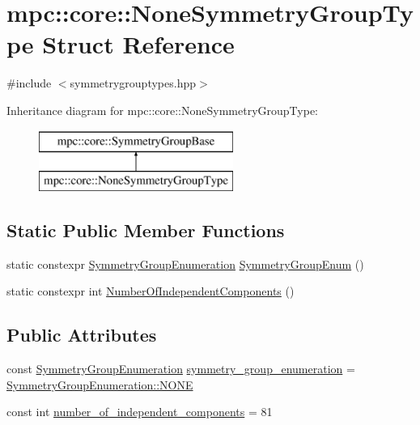 \hypertarget{structmpc_1_1core_1_1_none_symmetry_group_type}{}\section{mpc\+:\+:core\+:\+:None\+Symmetry\+Group\+Type Struct Reference}
\label{structmpc_1_1core_1_1_none_symmetry_group_type}


{\ttfamily \#include $<$symmetrygrouptypes.\+hpp$>$}

Inheritance diagram for mpc\+:\+:core\+:\+:None\+Symmetry\+Group\+Type\+:\begin{figure}[H]
\begin{center}
\leavevmode
\includegraphics[height=2.000000cm]{structmpc_1_1core_1_1_none_symmetry_group_type}
\end{center}
\end{figure}
\subsection*{Static Public Member Functions}
\begin{DoxyCompactItemize}
\item 
static constexpr \mbox{\hyperlink{namespacempc_1_1core_a9d979684062547055a0ef5c13077bad8}{Symmetry\+Group\+Enumeration}} \mbox{\hyperlink{structmpc_1_1core_1_1_none_symmetry_group_type_a3d387ccf340263f1101524006e073d18}{Symmetry\+Group\+Enum}} ()
\item 
static constexpr int \mbox{\hyperlink{structmpc_1_1core_1_1_none_symmetry_group_type_a446a3cf749fa3186a608820301dee584}{Number\+Of\+Independent\+Components}} ()
\end{DoxyCompactItemize}
\subsection*{Public Attributes}
\begin{DoxyCompactItemize}
\item 
const \mbox{\hyperlink{namespacempc_1_1core_a9d979684062547055a0ef5c13077bad8}{Symmetry\+Group\+Enumeration}} \mbox{\hyperlink{structmpc_1_1core_1_1_none_symmetry_group_type_a602e3f58d42e2e828e149d4945958984}{symmetry\+\_\+group\+\_\+enumeration}} = \mbox{\hyperlink{namespacempc_1_1core_a9d979684062547055a0ef5c13077bad8ab50339a10e1de285ac99d4c3990b8693}{Symmetry\+Group\+Enumeration\+::\+N\+O\+NE}}
\item 
const int \mbox{\hyperlink{structmpc_1_1core_1_1_none_symmetry_group_type_a7a42df9f755da6327c802277a8417eba}{number\+\_\+of\+\_\+independent\+\_\+components}} = 81
\end{DoxyCompactItemize}


